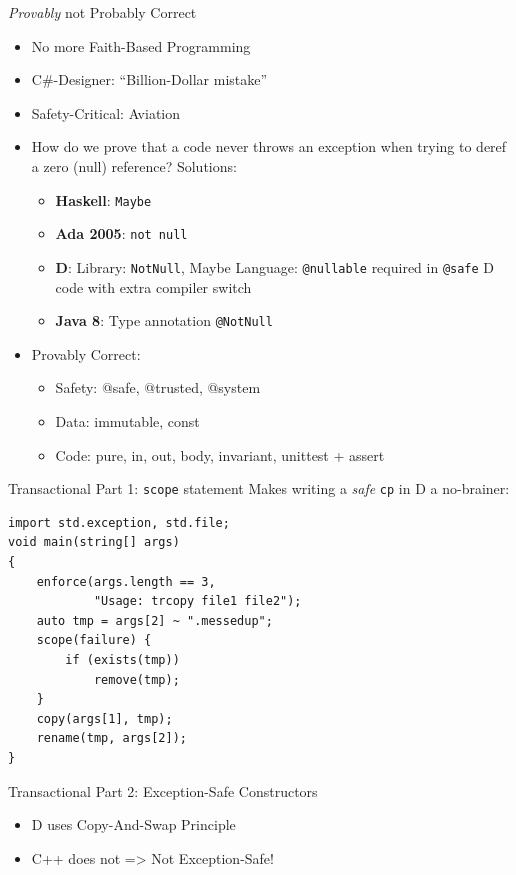 \documentclass[xcolor=dvipsnames]{beamer}
\begin{document}
\begin{frame}[fragile]{\emph{Provably} not Probably Correct}
  \begin{itemize}[<+->]
  \item No more Faith-Based Programming
  \item C\#-Designer: ``Billion-Dollar mistake''
  \item Safety-Critical: Aviation
  \item How do we prove that a code never throws an exception when trying to
    deref a zero (null) reference? Solutions:
    \begin{itemize}[<+->]
    \item \textbf{Haskell}: \texttt{Maybe}
    \item \textbf{Ada 2005}: \texttt{not null}
    \item \textbf{D}: Library: \texttt{NotNull}, Maybe Language:
      \texttt{@nullable} required in \texttt{@safe} D code with extra compiler
      switch
    \item \textbf{Java 8}: Type annotation \texttt{@NotNull}
    \end{itemize}
\item Provably Correct:
  \begin{itemize}[<+->]
  \item Safety: @safe, @trusted, @system
  \item  Data: immutable, const
  \item Code: pure, in, out, body, invariant, unittest + assert
  \end{itemize}
\end{itemize}
\end{frame}

\begin{frame}[fragile]{Transactional Part 1: \texttt{scope} statement}
Makes writing a \emph{safe} \texttt{cp} in D a no-brainer:
\begin{lstlisting}[frame=single]
import std.exception, std.file;
void main(string[] args)
{
    enforce(args.length == 3,
            "Usage: trcopy file1 file2");
    auto tmp = args[2] ~ ".messedup";
    scope(failure) {
        if (exists(tmp))
            remove(tmp);
    }
    copy(args[1], tmp);
    rename(tmp, args[2]);
}
\end{lstlisting}
\end{frame}

\begin{frame}[fragile]{Transactional Part 2: Exception-Safe Constructors}
  \begin{itemize}[<+->]
  \item D uses Copy-And-Swap Principle
  \item C++ does not => Not Exception-Safe!
  \end{itemize}
\end{frame}
\end{document}
